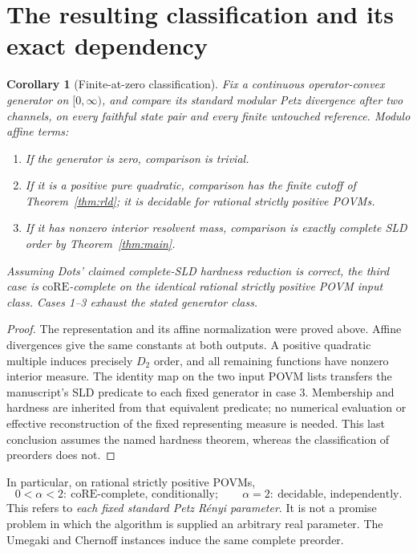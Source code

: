 \documentclass[11pt]{article}
\newtheorem{corollary}{Corollary}
\begin{document}
\section{The resulting classification and its exact dependency}
\begin{corollary}[Finite-at-zero classification]\label{cor:classification}
Fix a continuous operator-convex generator on $[0,\infty)$, and compare its
standard modular Petz divergence after two channels, on every faithful state
pair and every finite untouched reference. Modulo affine terms:
\begin{enumerate}
\item If the generator is zero, comparison is trivial.
\item If it is a positive pure quadratic, comparison has the finite cutoff of
Theorem~\ref{thm:rld}; it is decidable for rational strictly positive POVMs.
\item If it has nonzero interior resolvent mass, comparison is exactly complete
SLD order by Theorem~\ref{thm:main}.
\end{enumerate}
Assuming Dots' claimed complete-SLD hardness reduction is correct, the third
case is $\mathrm{coRE}$-complete on the identical rational strictly positive
POVM input class. Cases 1--3 exhaust the stated generator class.
\end{corollary}

\begin{proof}
The representation and its affine normalization were proved above. Affine
divergences give the same constants at both outputs. A positive quadratic
multiple induces precisely $D_2$ order, and all remaining functions have
nonzero interior measure. The identity map on the two input POVM lists transfers
the manuscript's SLD predicate to each fixed generator in case 3. Membership
and hardness are inherited from that equivalent predicate; no numerical
evaluation or effective reconstruction of the fixed representing measure is
needed. This last conclusion assumes the named hardness theorem, whereas the
classification of preorders does not.
\end{proof}

In particular, on rational strictly positive POVMs,
\[
 \boxed{0<\alpha<2:\ \mathrm{coRE}\text{-complete, conditionally};
 \qquad \alpha=2:\ \text{decidable, independently}.}
\]
This refers to \emph{each fixed standard Petz R\'enyi parameter}. It is not a
promise problem in which the algorithm is supplied an arbitrary real parameter.
The Umegaki and Chernoff instances induce the same complete preorder.
\end{document}
